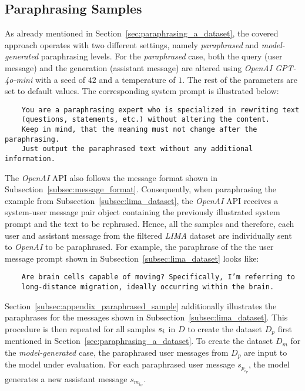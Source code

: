 \subsection{Paraphrasing Samples}\label{sec:paraphrasing_samples}
As already mentioned in Section~\ref{sec:paraphrasing_a_dataset}, the covered approach operates with two different settings, namely \emph{paraphrased} and \emph{model-generated} paraphrasing levels. For the \emph{paraphrased} case, both the query (user message) and the generation (assistant message) are altered using \emph{OpenAI GPT-4o-mini} with a seed of $42$ and a temperature of $1$. The rest of the parameters are set to default values. The corresponding system prompt is illustrated below:
\begin{verbatim}
    You are a paraphrasing expert who is specialized in rewriting text 
    (questions, statements, etc.) without altering the content. 
    Keep in mind, that the meaning must not change after the paraphrasing. 
    Just output the paraphrased text without any additional information.
\end{verbatim}
The \emph{OpenAI} API also follows the message format shown in Subsection~\ref{subsec:message_format}. Consequently, when paraphrasing the example from Subsection~\ref{subsec:lima_dataset}, the \emph{OpenAI} API receives a system-user message pair object containing the previously illustrated system prompt and the text to be rephrased. Hence, all the samples and therefore, each user and assistant message from the filtered \emph{LIMA} dataset are individually sent to \emph{OpenAI} to be paraphrased. For example, the paraphrase of the the user message prompt shown in Subsection~\ref{subsec:lima_dataset} looks like:
\begin{verbatim}
    Are brain cells capable of moving? Specifically, I’m referring to
    long-distance migration, ideally occurring within the brain.
\end{verbatim}
Section~\ref{subsec:appendix_paraphrased_sample} additionally illustrates the paraphrases for the messages shown in Subsection~\ref{subsec:lima_dataset}. This procedure is then repeated for all samples $s_i$ in $D$ to create the dataset $D_p$ first mentioned in Section~\ref{sec:paraphrasing_a_dataset}. To create the dataset $D_m$ for the \emph{model-generated} case, the paraphrased user messages from $D_p$ are input to the model under evaluation. For each paraphrased user message $s_{p_{i_P}}$, the model generates a new assistant message $s_{m_{i_G}}$.

